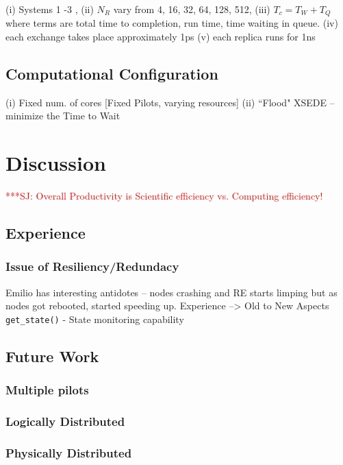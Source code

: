 \documentclass{sig-alternate}
\newcommand{\jhanote}[1]{ {\textcolor{red} { ***SJ: #1 }}}
\newcommand{\jhanote}[1]{}
\begin{document}
(i) Systems 1 -3 , (ii) $N_R$ vary from 4, 16, 32, 64, 128, 512, (iii)
$T_c = T_W + T_Q$ where terms are total time to completion, run time,
time waiting in queue.  (iv) each exchange takes place approximately
1ps (v) each replica runs for 1ns


\subsection{Computational Configuration}
(i) Fixed num. of cores [Fixed Pilots, varying resources] (ii) ``Flood"
XSEDE -- minimize the Time to Wait

\section{Discussion}

\jhanote{Overall Productivity is Scientific efficiency vs. Computing
  efficiency!}

\subsection{Experience}

\subsubsection{Issue of Resiliency/Redundacy} Emilio has interesting
antidotes -- nodes crashing and RE starts limping but as nodes got
rebooted, started speeding up.  Experience --> Old to New Aspects
\texttt{get\_state()} - State monitoring capability


\subsection{Future Work}

\subsubsection{Multiple pilots}

\subsubsection{Logically Distributed}
\subsubsection{Physically Distributed}
\end{document}

